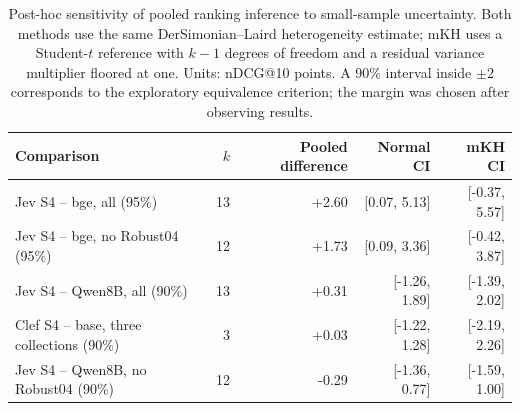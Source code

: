 \begin{table}[t]
\centering
\small
\caption{Post-hoc sensitivity of pooled ranking inference to small-sample uncertainty. Both methods use the same DerSimonian--Laird heterogeneity estimate; mKH uses a Student-$t$ reference with $k-1$ degrees of freedom and a residual variance multiplier floored at one. Units: nDCG@10 points. A 90\% interval inside $\pm2$ corresponds to the exploratory equivalence criterion; the margin was chosen after observing results.}
\label{tab:meta-sensitivity}
\begin{tabular}{lrrrr}
\toprule
Comparison & $k$ & Pooled difference & Normal CI & mKH CI \\
\midrule
Jev S4 -- bge, all (95\%) & 13 & +2.60 & [0.07, 5.13] & [-0.37, 5.57] \\
Jev S4 -- bge, no Robust04 (95\%) & 12 & +1.73 & [0.09, 3.36] & [-0.42, 3.87] \\
Jev S4 -- Qwen8B, all (90\%) & 13 & +0.31 & [-1.26, 1.89] & [-1.39, 2.02] \\
Clef S4 -- base, three collections (90\%) & 3 & +0.03 & [-1.22, 1.28] & [-2.19, 2.26] \\
Jev S4 -- Qwen8B, no Robust04 (90\%) & 12 & -0.29 & [-1.36, 0.77] & [-1.59, 1.00] \\
\bottomrule
\end{tabular}
\end{table}
